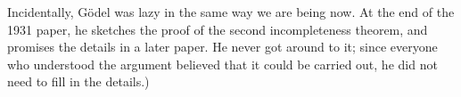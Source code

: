 \documentclass[../../include/open-logic-section]{subfiles}
\begin{document}
\begin{digress}
Incidentally, G\"odel was lazy in the same way we are
being now. At the end of the 1931 paper, he sketches the proof of the
second incompleteness theorem, and promises the details in a later
paper. He never got around to it; since everyone who understood the
argument believed that it could be carried out, he did not need to
fill in the details.)
\end{digress}
\end{document}
